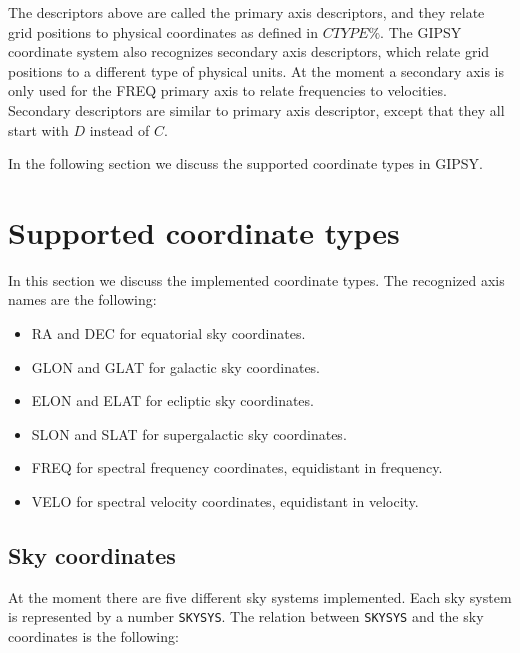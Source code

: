 The descriptors above are called the primary axis descriptors, and they
relate grid positions to physical coordinates as defined in $CTYPE\%$.
The GIPSY coordinate system also recognizes secondary axis descriptors,
which relate grid positions to a different type of physical units. At
the moment a secondary axis is only used for the FREQ primary axis to
relate frequencies to velocities. Secondary descriptors are similar to
primary axis descriptor, except that they all start with $D$ instead of
$C$.

In the following section we discuss the supported coordinate types in
GIPSY.

\section{Supported coordinate types}

In this section we discuss the implemented coordinate types. The
recognized axis names are the following:

\begin{itemize}

\item RA and DEC for equatorial sky coordinates.

\item GLON and GLAT for galactic sky
coordinates.

\item ELON and ELAT for ecliptic sky
coordinates.

\item SLON and SLAT for supergalactic sky
coordinates.

\item FREQ for spectral frequency coordinates, equidistant
in frequency.

\item VELO for spectral velocity coordinates, equidistant in
velocity.

\end{itemize}

\subsection{Sky coordinates}

At the moment there are five different sky systems implemented. Each sky
system is represented by a number {\tt SKYSYS}. The relation between
{\tt SKYSYS} and the sky coordinates is the following:


